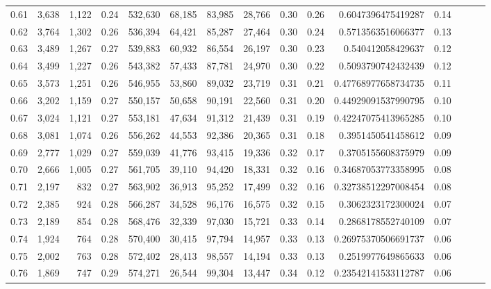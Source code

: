 \begin{tabular}{rrrrrrrrrrrrrrr}
0.61 &   3,638 &  1,122 &  0.24 &  532,630 &   68,185 &   83,985 &   28,766 &  0.30 &  0.26 &    0.6047396475419287 &      0.14 \\
0.62 &   3,764 &  1,302 &  0.26 &  536,394 &   64,421 &   85,287 &   27,464 &  0.30 &  0.24 &    0.5713563516066377 &      0.13 \\
0.63 &   3,489 &  1,267 &  0.27 &  539,883 &   60,932 &   86,554 &   26,197 &  0.30 &  0.23 &     0.540412058429637 &      0.12 \\
0.64 &   3,499 &  1,227 &  0.26 &  543,382 &   57,433 &   87,781 &   24,970 &  0.30 &  0.22 &    0.5093790742432439 &      0.12 \\
0.65 &   3,573 &  1,251 &  0.26 &  546,955 &   53,860 &   89,032 &   23,719 &  0.31 &  0.21 &   0.47768977658734735 &      0.11 \\
0.66 &   3,202 &  1,159 &  0.27 &  550,157 &   50,658 &   90,191 &   22,560 &  0.31 &  0.20 &   0.44929091537990795 &      0.10 \\
0.67 &   3,024 &  1,121 &  0.27 &  553,181 &   47,634 &   91,312 &   21,439 &  0.31 &  0.19 &   0.42247075413965285 &      0.10 \\
0.68 &   3,081 &  1,074 &  0.26 &  556,262 &   44,553 &   92,386 &   20,365 &  0.31 &  0.18 &    0.3951450541458612 &      0.09 \\
0.69 &   2,777 &  1,029 &  0.27 &  559,039 &   41,776 &   93,415 &   19,336 &  0.32 &  0.17 &    0.3705155608375979 &      0.09 \\
0.70 &   2,666 &  1,005 &  0.27 &  561,705 &   39,110 &   94,420 &   18,331 &  0.32 &  0.16 &   0.34687053773358995 &      0.08 \\
0.71 &   2,197 &    832 &  0.27 &  563,902 &   36,913 &   95,252 &   17,499 &  0.32 &  0.16 &   0.32738512297008454 &      0.08 \\
0.72 &   2,385 &    924 &  0.28 &  566,287 &   34,528 &   96,176 &   16,575 &  0.32 &  0.15 &    0.3062323172300024 &      0.07 \\
0.73 &   2,189 &    854 &  0.28 &  568,476 &   32,339 &   97,030 &   15,721 &  0.33 &  0.14 &    0.2868178552740109 &      0.07 \\
0.74 &   1,924 &    764 &  0.28 &  570,400 &   30,415 &   97,794 &   14,957 &  0.33 &  0.13 &   0.26975370506691737 &      0.06 \\
0.75 &   2,002 &    763 &  0.28 &  572,402 &   28,413 &   98,557 &   14,194 &  0.33 &  0.13 &    0.2519977649865633 &      0.06 \\
0.76 &   1,869 &    747 &  0.29 &  574,271 &   26,544 &   99,304 &   13,447 &  0.34 &  0.12 &   0.23542141533112787 &      0.06 \\

\end{tabular}
